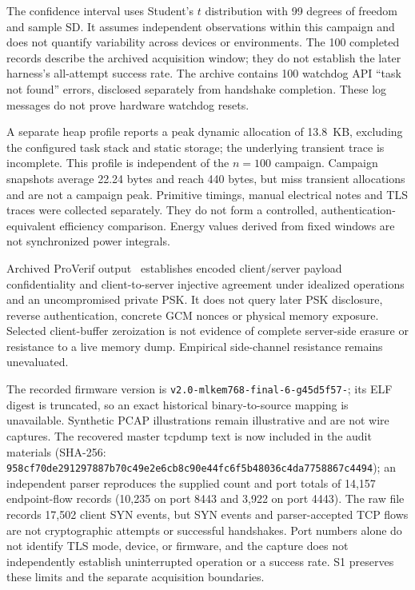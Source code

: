 \documentclass[pdflatex,sn-mathphys-num]{sn-jnl}
\begin{document}
The confidence interval uses Student's $t$ distribution with 99 degrees of freedom and sample SD. It assumes independent observations within this campaign and does not quantify variability across devices or environments. The 100 completed records describe the archived acquisition window; they do not establish the later harness's all-attempt success rate. The archive contains 100 watchdog API ``task not found'' errors, disclosed separately from handshake completion. These log messages do not prove hardware watchdog resets.

A separate heap profile reports a peak dynamic allocation of 13.8~KB, excluding the configured task stack and static storage; the underlying transient trace is incomplete. This profile is independent of the $n=100$ campaign. Campaign snapshots average 22.24 bytes and reach 440 bytes, but miss transient allocations and are not a campaign peak. Primitive timings, manual electrical notes and TLS traces were collected separately. They do not form a controlled, authentication-equivalent efficiency comparison. Energy values derived from fixed windows are not synchronized power integrals.

Archived ProVerif output~\cite{b25} establishes encoded client/server payload confidentiality and client-to-server injective agreement under idealized operations and an uncompromised private PSK. It does not query later PSK disclosure, reverse authentication, concrete GCM nonces or physical memory exposure. Selected client-buffer zeroization is not evidence of complete server-side erasure or resistance to a live memory dump. Empirical side-channel resistance remains unevaluated.

The recorded firmware version is \texttt{v2.0-mlkem768-final-6-g45d5f57-}; its ELF digest is truncated, so an exact historical binary-to-source mapping is unavailable. Synthetic PCAP illustrations remain illustrative and are not wire captures. The recovered master tcpdump text is now included in the audit materials (SHA-256: \texttt{958cf70de291297887b70c49e2e6cb8c90e44fc6f5b48036c4da7758867c4494}); an independent parser reproduces the supplied count and port totals of 14,157 endpoint-flow records (10,235 on port 8443 and 3,922 on port 4443). The raw file records 17,502 client SYN events, but SYN events and parser-accepted TCP flows are not cryptographic attempts or successful handshakes. Port numbers alone do not identify TLS mode, device, or firmware, and the capture does not independently establish uninterrupted operation or a success rate. S1 preserves these limits and the separate acquisition boundaries.
\end{document}
